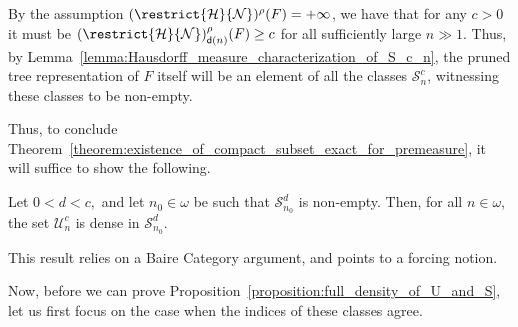By the assumption $(\restrict{\mathcal{H}}{\mathcal{N}})^\rho(F) = +\infty$, we have that for any $c > 0$ it must be $(\restrict{\mathcal{H}}{\mathcal{N}})^\rho_{\mathsf{d}(n)}(F) \geq c$ for all sufficiently large $n \gg 1$. Thus, by Lemma~\ref{lemma:Hausdorff_measure_characterization_of_S_c_n}, the pruned tree representation of $F$ itself will be an element of all the classes $\mathcal{S}^c_n$, witnessing these classes to be non-empty.   

Thus, to conclude Theorem~\ref{theorem:existence_of_compact_subset_exact_for_premeasure}, it will suffice to show the following.

\begin{proposition}
    \label{proposition:full_density_of_U_and_S}
    Let $0 < d < c,$ and let $n_0 \in \omega$ be such that $\mathcal{S}^d_{n_0}$ is non-empty. Then, for all $n \in \omega$, the set $\mathcal{U}^c_n$ is dense in $\mathcal{S}^d_{n_0}$.
\end{proposition}

This result relies on a Baire Category argument, and points to a forcing notion. 

Now, before we can prove Proposition~\ref{proposition:full_density_of_U_and_S}, let us first focus on the case when the indices of these classes agree.

